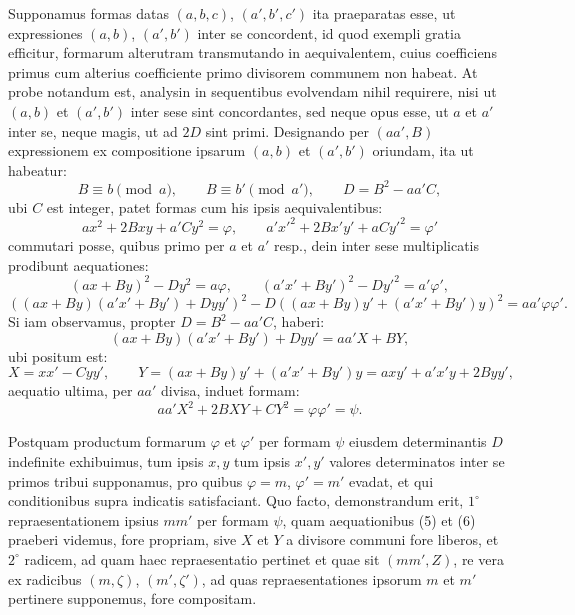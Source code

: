 \documentclass[11pt]{article}
\begin{document}
Supponamus formas datas $(a,b,c)$, $(a',b',c')$ ita praeparatas esse, ut expressiones $(a,b)$, $(a',b')$ inter se concordent, id quod exempli gratia efficitur, formarum alterutram transmutando in aequivalentem, cuius coefficiens primus cum alterius coefficiente primo divisorem communem non habeat. At probe notandum est, analysin in sequentibus evolvendam nihil requirere, nisi ut $(a,b)$ et $(a',b')$ inter sese sint concordantes, sed neque opus esse, ut $a$ et $a'$ inter se, neque magis, ut ad $2D$ sint primi. Designando per $(aa',B)$ expressionem ex compositione ipsarum $(a,b)$ et $(a',b')$ oriundam, ita ut habeatur:
\[
 B\equiv b\pmod a,\qquad B\equiv b'\pmod {a'},\qquad D=B^2-aa'C,
\]
ubi $C$ est integer, patet formas cum his ipsis aequivalentibus:
\[
 ax^2+2Bxy+a'Cy^2=\varphi,\qquad a'x'^2+2Bx'y'+aCy'^2=\varphi'
\]
commutari posse, quibus primo per $a$ et $a'$ resp., dein inter sese multiplicatis prodibunt aequationes:
\[
 (ax+By)^2-Dy^2=a\varphi,\qquad (a'x'+By')^2-Dy'^2=a'\varphi',
\]
\[
 ((ax+By)(a'x'+By')+Dyy')^2-D((ax+By)y'+(a'x'+By')y)^2=aa'\varphi\varphi'.
\]
Si iam observamus, propter $D=B^2-aa'C$, haberi:
\begin{equation}\tag{4}
 (ax+By)(a'x'+By')+Dyy'=aa'X+BY,
\end{equation}
ubi positum est:
\begin{equation}\tag{5}
 X=xx'-Cyy',\qquad Y=(ax+By)y'+(a'x'+By')y=axy'+a'x'y+2Byy',
\end{equation}
aequatio ultima, per $aa'$ divisa, induet formam:
\begin{equation}\tag{6}
 aa'X^2+2BXY+CY^2=\varphi\varphi'=\psi.
\end{equation}

Postquam productum formarum $\varphi$ et $\varphi'$ per formam $\psi$ eiusdem determinantis $D$ indefinite exhibuimus, tum ipsis $x,y$ tum ipsis $x',y'$ valores determinatos inter se primos tribui supponamus, pro quibus $\varphi=m$, $\varphi'=m'$ evadat, et qui conditionibus supra indicatis satisfaciant. Quo facto, demonstrandum erit, $1^\circ$ repraesentationem ipsius $mm'$ per formam $\psi$, quam aequationibus (5) et (6) praeberi videmus, fore propriam, sive $X$ et $Y$ a divisore communi fore liberos, et $2^\circ$ radicem, ad quam haec repraesentatio pertinet et quae sit $(mm',Z)$, re vera ex radicibus $(m,\zeta)$, $(m',\zeta')$, ad quas repraesentationes ipsorum $m$ et $m'$ pertinere supponemus, fore compositam.
\end{document}
